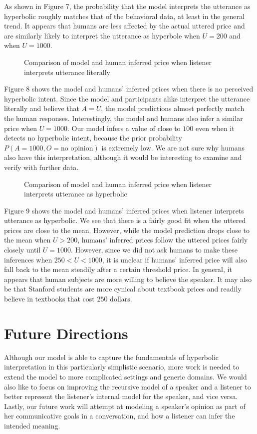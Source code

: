 \documentclass{article} %
\begin{document}
As shown in Figure 7, the probability that the model interprets the utterance as hyperbolic roughly matches that of the behavioral data, at least in the general trend. It appears that humans are less affected by the actual uttered price and are similarly likely to interpret the utterance as hyperbole when $U = 200$ and when $U = 1000$.

\begin{figure}[tl]
\caption{Comparison of model and human inferred price when listener interprets utterance literally}
\end{figure}

Figure 8 shows the model and humans' inferred prices when there is no perceived hyperbolic intent. Since the model and participants alike interpret the utterance literally and believe that $A = U$, the model predictions almost perfectly match the human responses. Interestingly, the model and humans also infer a similar price when $U = 1000$. Our model infers a value of close to $100$ even when it detects no hyperbolic intent, because the prior probability $P(A = 1000, O = \text{no opinion})$ is extremely low. We are not sure why humans also have this interpretation, although it would  be interesting to examine and verify with further data.

\begin{figure}[tl]
\caption{Comparison of model and human inferred price when listener interprets utterance as hyperbolic}
\end{figure}

Figure 9 shows the model and humans' inferred prices when listener interprets utterance as hyperbolic. We see that there is a fairly good fit when the uttered prices are close to the mean. However, while the model prediction drops close to the mean when $U > 200$, humans' inferred prices follow the uttered prices fairly closely until $U = 1000$. However, since we did not ask humans to make these inferences when $ 250 < U < 1000$, it is unclear if humans' inferred price will also fall back to the mean steadily after a certain threshold price. In general, it appears that human subjects are more willing to believe the speaker. It may also be that Stanford students are more cynical about textbook prices and readily believe in textbooks that cost $250$ dollars.


\section{Future Directions}
Although our model is able to capture the fundamentals of hyperbolic interpretation in this particularly simplistic scenario, more work is needed to extend the model to more complicated settings and generic domains. We would also like to focus on improving the recursive model of a speaker and a listener to better represent the listener's internal model for the speaker, and vice versa. Lastly, our future work will attempt at modeling a speaker's opinion as part of her communicative goals in a conversation, and how a listener can infer the intended meaning.
\end{document}
